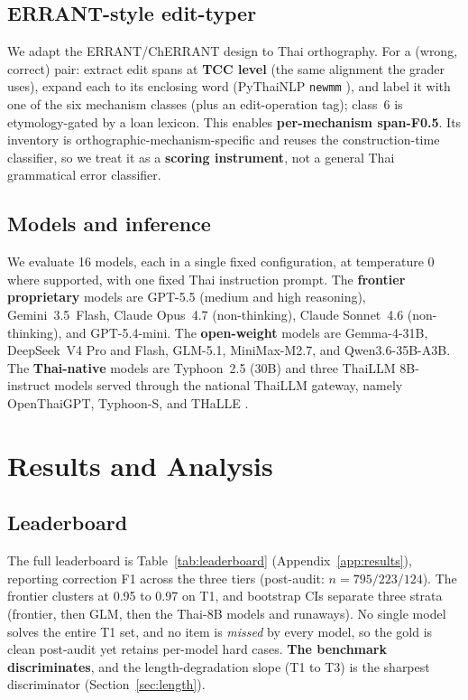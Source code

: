 \documentclass[11pt]{article}
\begin{document}
\subsection{ERRANT-style edit-typer}
\label{sec:typer}
We adapt the ERRANT/ChERRANT design
\citep{bryant-etal-2017-automatic,zhang-etal-2022-mucgec} to Thai orthography. For a (wrong,
correct) pair: extract edit spans at \textbf{TCC level} (the same alignment the grader uses),
expand each to its enclosing word (PyThaiNLP \texttt{newmm}
\citep{phatthiyaphaibun-etal-2023-pythainlp}), and label it with one of the six mechanism
classes (plus an edit-operation tag); class~6 is etymology-gated by a loan lexicon. This enables
\textbf{per-mechanism span-F0.5}. Its inventory is orthographic-mechanism-specific and reuses
the construction-time classifier, so we treat it as a \textbf{scoring instrument}, not a
general Thai grammatical error classifier.

\subsection{Models and inference}
We evaluate 16 models, each in a single fixed configuration, at temperature 0 where supported,
with one fixed Thai instruction prompt. The \textbf{frontier proprietary} models are GPT-5.5
(medium and high reasoning), Gemini~3.5~Flash, Claude Opus~4.7 (non-thinking), Claude
Sonnet~4.6 (non-thinking), and GPT-5.4-mini. The \textbf{open-weight} models are Gemma-4-31B,
DeepSeek~V4 Pro and Flash, GLM-5.1, MiniMax-M2.7, and Qwen3.6-35B-A3B. The \textbf{Thai-native}
models are Typhoon~2.5 (30B) and three ThaiLLM 8B-instruct models served through the national
ThaiLLM gateway, namely OpenThaiGPT, Typhoon-S, and THaLLE
\citep{pipatanakul-etal-2024-typhoon2,pipatanakul-etal-2026-typhoons}.

\section{Results and Analysis}

\subsection{Leaderboard}
The full leaderboard is Table~\ref{tab:leaderboard} (Appendix~\ref{app:results}), reporting
correction F1 across the three tiers (post-audit: $n = 795 / 223 / 124$). The frontier clusters at 0.95 to 0.97 on T1, and bootstrap CIs
separate three strata (frontier, then GLM, then the Thai-8B models and runaways). No single
model solves the entire T1 set, and no item is \emph{missed} by every model, so the gold is
clean post-audit yet retains per-model hard cases. \textbf{The benchmark discriminates}, and
the length-degradation slope (T1 to T3) is the sharpest discriminator (Section~\ref{sec:length}).
\end{document}
